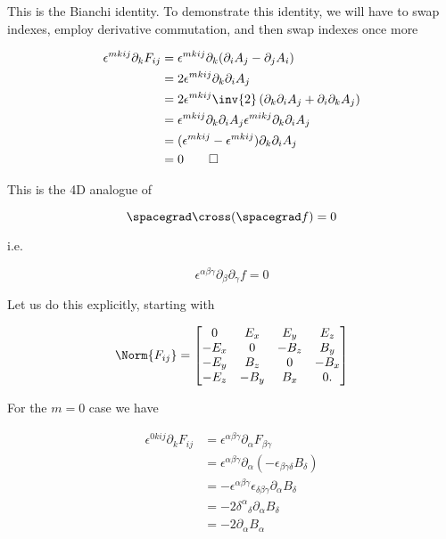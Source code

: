 This is the Bianchi identity.  To demonstrate this identity, we will have to swap indexes, employ derivative commutation, and then swap indexes once more

\begin{align*}
\epsilon^{m k i j} \partial_k F_{i j} 
&= \epsilon^{m k i j} \partial_k (\partial_i A_j - \partial_j A_i) \\
&= 2 \epsilon^{m k i j} \partial_k \partial_i A_j \\
&= 2 \epsilon^{m k i j} \inv{2} \left( \partial_k \partial_i A_j + \partial_i \partial_k A_j \right) \\
&= 
\epsilon^{m k i j} \partial_k \partial_i A_j 
\epsilon^{m i k j} \partial_k \partial_i A_j  \\
&= 
(\epsilon^{m k i j} - \epsilon^{m k i j}) \partial_k \partial_i A_j \\
&= 0 \qquad \square
\end{align*}

This is the 4D analogue of 

\begin{equation}\label{eqn:relativisticElectrodynamicsL11:790}
\spacegrad \cross (\spacegrad f) = 0
\end{equation}

i.e.

\begin{equation}\label{eqn:relativisticElectrodynamicsL11:810}
\epsilon^{\alpha\beta\gamma} \partial_\beta \partial_\gamma f = 0
\end{equation}

Let us do this explicitly, starting with

\begin{equation}\label{eqn:relativisticElectrodynamicsL11:370b}
\Norm{ F_{i j} } = 
\begin{bmatrix}
0 & E_x & E_y & E_z \\
-E_x & 0 & -B_z & B_y \\
-E_y & B_z & 0 & -B_x \\
-E_z & -B_y & B_x & 0.
\end{bmatrix}
\end{equation}

For the $m= 0$ case we have

\begin{align*}
\epsilon^{0 k i j} \partial_k F_{i j}
&=
\epsilon^{\alpha \beta \gamma} \partial_\alpha F_{\beta \gamma} \\
&= 
\epsilon^{\alpha \beta \gamma} \partial_\alpha (-\epsilon_{\beta \gamma \delta} B_\delta) \\
&= 
-\epsilon^{\alpha \beta \gamma} \epsilon_{\delta \beta \gamma }
\partial_\alpha B_\delta \\
&= 
- 2 {\delta^\alpha}_\delta \partial_\alpha B_\delta \\
&= 
- 2 \partial_\alpha B_\alpha 
\end{align*}

